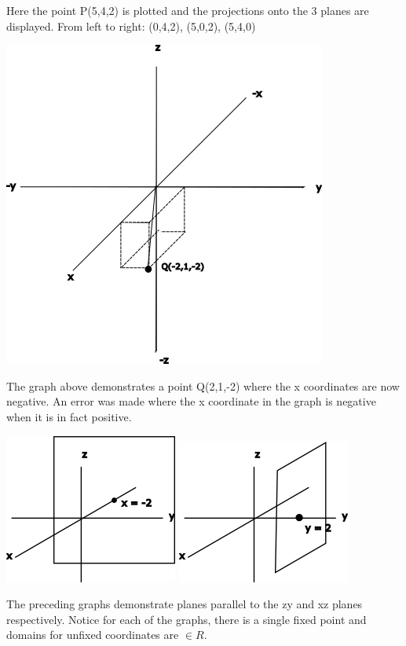 \documentclass[12pt]{article}
\begin{document}
Here the point P(5,4,2) is plotted and the projections onto the 3 planes are displayed.
From left to right: (0,4,2), (5,0,2), (5,4,0)

\includegraphics{projection2}

The graph above demonstrates a point Q(2,1,-2) where the x coordinates are now negative.
An error was made where the x coordinate in the graph is negative when it is in fact positive.

\includegraphics{parallelzy}
\includegraphics{parallelxz}

The preceding graphs demonstrate planes parallel to the zy and xz planes respectively. 
Notice for each of the graphs, there is a single fixed point and domains for unfixed coordinates are $\in{R}$.
\end{document}
